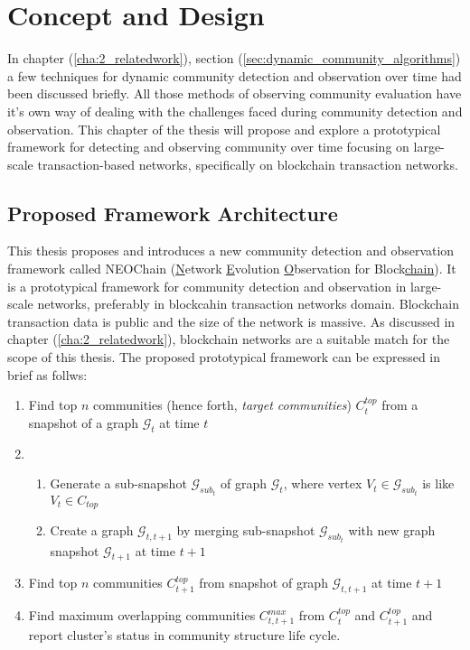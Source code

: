 \chapter{Concept and Design}\label{cha:3_concept_and_design}
In chapter (\ref{cha:2_relatedwork}), section (\ref{sec:dynamic_community_algorithms}) a few techniques for dynamic community detection and observation over time had been discussed briefly. All those methods of observing community evaluation have it's own way of dealing with the challenges faced during community detection and observation. This chapter of the thesis will propose and explore a prototypical framework for detecting and observing community over time focusing on large-scale transaction-based networks, specifically on blockchain transaction networks.

\section{Proposed Framework Architecture}\label{sec:framework}
This thesis proposes and introduces a new community detection and observation framework called NEOChain (\underline{N}etwork \underline{E}volution \underline{O}bservation for Block\underline{chain}). It is a prototypical framework for community detection and observation in large-scale networks, preferably in blockcahin transaction networks domain. Blockchain transaction data is public and the size of the network is massive. As discussed in chapter (\ref{cha:2_relatedwork}), blockchain networks are a suitable match for the scope of this thesis. The proposed prototypical framework can be expressed in brief as follws:

\begin{enumerate}[label=(\roman*)]
\item Find top $n$ communities (hence forth, \textit{target communities}) $C_t^{top}$ from a snapshot of a graph $\mathcal{G}_t$ at time $t$
\item
\begin{enumerate}
	\item Generate a sub-snapshot $\mathcal{G}_{sub_{t}}$ of graph $\mathcal{G}_t$, where vertex $V_t 		\in \mathcal{G}_{sub_{t}}$ is like $V_t \in C_{top}$ 
	\item Create a graph $\mathcal{G}_{t, t+1}$ by merging sub-snapshot $\mathcal{G}_{sub_{t}}$ with 		new graph snapshot $\mathcal{G}_{t+1}$ at time $t+1$
\end{enumerate}
\item Find top $n$ communities $C_{t+1}^{top}$ from snapshot of graph $\mathcal{G}_{t, t+1}$ at time $t+1$
\item Find maximum overlapping communities $C_{t, t+1}^{max}$ from $C_t^{top}$ and $C_{t+1}^{top}$ and report cluster's status in community structure life cycle.
\end{enumerate}

